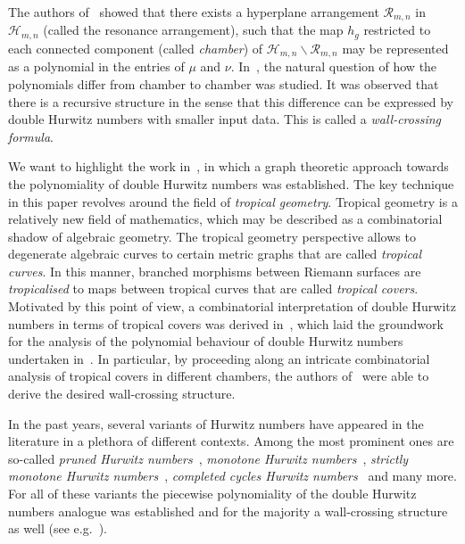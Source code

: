\documentclass[10pt]{amsart}
\theoremstyle{plain}
\theoremstyle{definition}
\theoremstyle{definition}
\theoremstyle{plain}
\theoremstyle{plain}
\theoremstyle{remark}
\theoremstyle{plain}
\theoremstyle{plain}
\begin{document}
The authors of~\cite{GJV05} showed that there exists a hyperplane arrangement $\mathcal{R}_{m,n}$ in $\mathcal{H}_{m,n}$ (called the resonance arrangement), such that the map $h_g$ restricted to each connected component (called \textit{chamber}) of $\mathcal{H}_{m,n}\backslash\mathcal{R}_{m,n}$ may be represented as a polynomial in the entries of $\mu$ and $\nu$. In~\cite{SSV08, CJM11, Joh15}, the natural question of how the polynomials differ from chamber to chamber was studied. It was observed that there is a recursive structure in the sense that this difference can be expressed by double Hurwitz numbers with smaller input data. This is called a \textit{wall-crossing formula}.

We want to highlight the work in~\cite{CJM11}, in which a graph theoretic approach towards the polynomiality of double Hurwitz numbers was established. The key technique in this paper revolves around the field of \textit{tropical geometry}. Tropical geometry is a relatively new field of mathematics, which may be described as a combinatorial shadow of algebraic geometry. The tropical geometry perspective allows to degenerate algebraic curves to certain metric graphs that are called \textit{tropical curves}. In this manner, branched morphisms between Riemann surfaces are \textit{tropicalised} to maps between tropical curves that are called \textit{tropical covers}. Motivated by this point of view, a combinatorial interpretation of double Hurwitz numbers in terms of tropical covers was derived in~\cite{CJM10}, which laid the groundwork for the analysis of the polynomial behaviour of double Hurwitz numbers undertaken in~\cite{CJM11}. In particular, by proceeding along an intricate combinatorial analysis of tropical covers in different chambers, the authors of~\cite{CJM11} were able to derive the desired wall-crossing structure.

In the past years, several variants of Hurwitz numbers have appeared in the literature in a plethora of different contexts. Among the most prominent ones are so-called \textit{pruned Hurwitz numbers}~\cite{do2018pruned,hahn2020bi}, \textit{monotone Hurwitz numbers}~\cite{goulden2014monotone}, \textit{strictly monotone Hurwitz numbers}~\cite{kazarian2015virasoro}, \textit{completed cycles Hurwitz numbers}~\cite{okounkov2006gromov} and many more. For all of these variants the piecewise polynomiality of the double Hurwitz numbers analogue was established and for the majority a wall-crossing structure as well (see e.g.~\cite{zbMATH06791415, hahn2018wall,hahn2020wall,shadrin2012double}).
\end{document}
